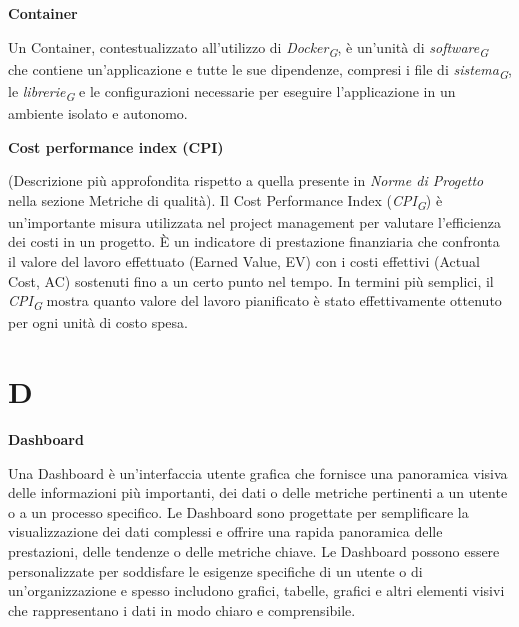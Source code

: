 \documentclass{article}
\begin{document}
\vspace{0.4cm}

\textbf{Container}

\vspace{0.1cm}

Un Container, contestualizzato all’utilizzo di \textit{Docker}\textsubscript{\textit{G}}, è un'unità di \textit{software}\textsubscript{\textit{G}} che contiene un'applicazione e tutte le sue dipendenze, compresi i file di \textit{sistema}\textsubscript{\textit{G}}, le \textit{librerie}\textsubscript{\textit{G}} e le configurazioni necessarie per eseguire l'applicazione in un ambiente isolato e autonomo.

\vspace{0.4cm}

\textbf{Cost performance index (CPI)}

\vspace{0.1cm}

(Descrizione più approfondita rispetto a quella presente in \textit{Norme di Progetto} nella sezione Metriche di qualità). Il Cost Performance Index (\textit{CPI}\textsubscript{\textit{G}}) è un'importante misura utilizzata nel project management per valutare l'efficienza dei costi in un progetto. È un indicatore di prestazione finanziaria che confronta il valore del lavoro effettuato (Earned Value, EV) con i costi effettivi (Actual Cost, AC) sostenuti fino a un certo punto nel tempo. In termini più semplici, il \textit{CPI}\textsubscript{\textit{G}} mostra quanto valore del lavoro pianificato è stato effettivamente ottenuto per ogni unità di costo spesa.

\pagebreak
\section*{D}
{}

\vspace{0.4cm}

\textbf{Dashboard}

\vspace{0.1cm}

Una Dashboard è un'interfaccia utente grafica che fornisce una panoramica visiva delle informazioni più importanti, dei dati o delle metriche pertinenti a un utente o a un processo specifico. Le Dashboard sono progettate per semplificare la visualizzazione dei dati complessi e offrire una rapida panoramica delle prestazioni, delle tendenze o delle metriche chiave. Le Dashboard possono essere personalizzate per soddisfare le esigenze specifiche di un utente o di un'organizzazione e spesso includono grafici, tabelle, grafici e altri elementi visivi che rappresentano i dati in modo chiaro e comprensibile.
\end{document}
